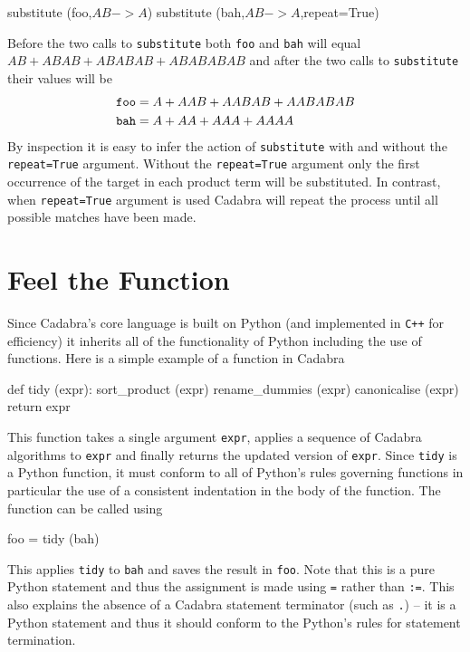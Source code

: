 \documentclass[a4paper,12pt]{article}
\numberwithin{equation}{section}%
\begin{document}
\begin{Exercises}
\begin{Exercise}
\begin{cadabra}
         substitute (foo,$A B -> A$)
         substitute (bah,$A B -> A$,repeat=True)
      \end{cadabra}
      Before the two calls to \verb|substitute| both \verb|foo| and \verb|bah| will equal
      $A B + A B A B + A B A B A B + A B A B A B A B$ and after the two calls to
      \verb|substitute| their values will be
      \begin{align*}
         {\tt foo} &= A + A A B + A A B A B + A A B A B A B\\
         {\tt bah} &= A + A A + A A A + A A A A
      \end{align*}
      By inspection it is easy to infer the action of \verb|substitute| with and without the
      \verb|repeat=True| argument. Without the \verb|repeat=True| argument only the first
      occurrence of the target in each product term will be substituted. In contrast, when
      \verb|repeat=True| argument is used Cadabra will repeat the process until all possible
      matches have been made.
   \end{Exercise}

\end{Exercises}

\clearpage

\section{Feel the Function}
\label{sec:ex-04}
\ResetCounters



Since Cadabra's core language is built on Python (and implemented in \verb|C++| for
efficiency) it inherits all of the functionality of Python including the use of functions.
Here is a simple example of a function in Cadabra
\begin{cadabra}
   def tidy (expr):
      sort_product   (expr)
      rename_dummies (expr)
      canonicalise   (expr)
      return expr
\end{cadabra}
This function takes a single argument \verb|expr|, applies a sequence of Cadabra algorithms
to \verb|expr| and finally returns the updated version of \verb|expr|. Since \verb|tidy| is
a Python function, it must conform to all of Python's rules governing functions in
particular the use of a consistent indentation in the body of the function. The function can
be called using
\begin{cadabra}[numbers=none]
   foo = tidy (bah)
\end{cadabra}
This applies \verb|tidy| to \verb|bah| and saves the result in \verb|foo|. Note that this is
a pure Python statement and thus the assignment is made using \verb|=| rather than
\verb|:=|. This also explains the absence of a Cadabra statement terminator (such as
\verb|.|) -- it is a Python statement and thus it should conform to the Python's rules for
statement termination.
\end{document}
